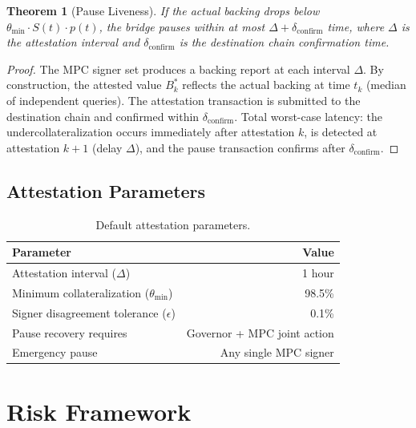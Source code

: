 \documentclass[11pt,twocolumn]{article}
\newtheorem{theorem}{Theorem}[section]
\begin{document}
\begin{theorem}[Pause Liveness]\label{thm:pause}
If the actual backing drops below $\theta_{\min} \cdot S(t) \cdot p(t)$, the bridge pauses within at most $\Delta + \delta_{\text{confirm}}$ time, where $\Delta$ is the attestation interval and $\delta_{\text{confirm}}$ is the destination chain confirmation time.
\end{theorem}

\begin{proof}
The MPC signer set produces a backing report at each interval $\Delta$. By construction, the attested value $B^*_k$ reflects the actual backing at time $t_k$ (median of independent queries). The attestation transaction is submitted to the destination chain and confirmed within $\delta_{\text{confirm}}$. Total worst-case latency: the undercollateralization occurs immediately after attestation $k$, is detected at attestation $k+1$ (delay $\Delta$), and the pause transaction confirms after $\delta_{\text{confirm}}$.
\end{proof}

\subsection{Attestation Parameters}

\begin{table}[ht]
\centering
\small
\caption{Default attestation parameters.}
\label{tab:attestation_params}
\begin{tabular}{@{}lr@{}}
\toprule
\textbf{Parameter} & \textbf{Value} \\
\midrule
Attestation interval ($\Delta$) & 1 hour \\
Minimum collateralization ($\theta_{\min}$) & 98.5\% \\
Signer disagreement tolerance ($\epsilon$) & 0.1\% \\
Pause recovery requires & Governor + MPC joint action \\
Emergency pause & Any single MPC signer \\
\bottomrule
\end{tabular}
\end{table}

\section{Risk Framework}\label{sec:risk}
\end{document}
